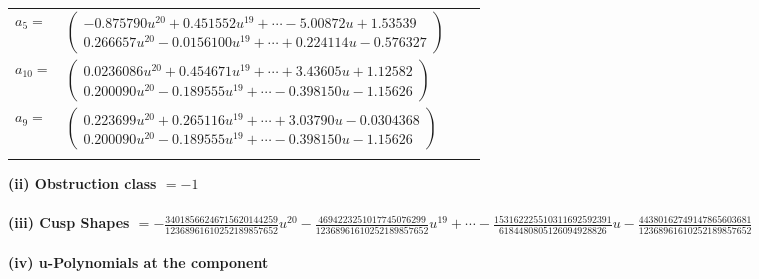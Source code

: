 \documentclass[1p]{elsarticle_modified}
\theoremstyle{definition}
\begin{document}
\begin{tabular}{m{7pt} m{180pt} m{7pt} m{180pt} }
\flushright $a_{5}=$&$\begin{pmatrix}-0.875790 u^{20}+0.451552 u^{19}+\cdots-5.00872 u+1.53539\\0.266657 u^{20}-0.0156100 u^{19}+\cdots+0.224114 u-0.576327\end{pmatrix}$ \\
\flushright $a_{10}=$&$\begin{pmatrix}0.0236086 u^{20}+0.454671 u^{19}+\cdots+3.43605 u+1.12582\\0.200090 u^{20}-0.189555 u^{19}+\cdots-0.398150 u-1.15626\end{pmatrix}$ \\
\flushright $a_{9}=$&$\begin{pmatrix}0.223699 u^{20}+0.265116 u^{19}+\cdots+3.03790 u-0.0304368\\0.200090 u^{20}-0.189555 u^{19}+\cdots-0.398150 u-1.15626\end{pmatrix}$\\&\end{tabular}
\flushleft \textbf{(ii) Obstruction class $= -1$}\\~\\
\flushleft \textbf{(iii) Cusp Shapes $= -\frac{34018566246715620144259}{12368961610252189857652} u^{20}-\frac{4694223251017745076299}{12368961610252189857652} u^{19}+\cdots-\frac{153162225510311692592391}{6184480805126094928826} u-\frac{44380162749147865603681}{12368961610252189857652}$}\\~\\
\newpage\renewcommand{\arraystretch}{1}
\flushleft \textbf{(iv) u-Polynomials at the component}\newline \\
\end{document}
